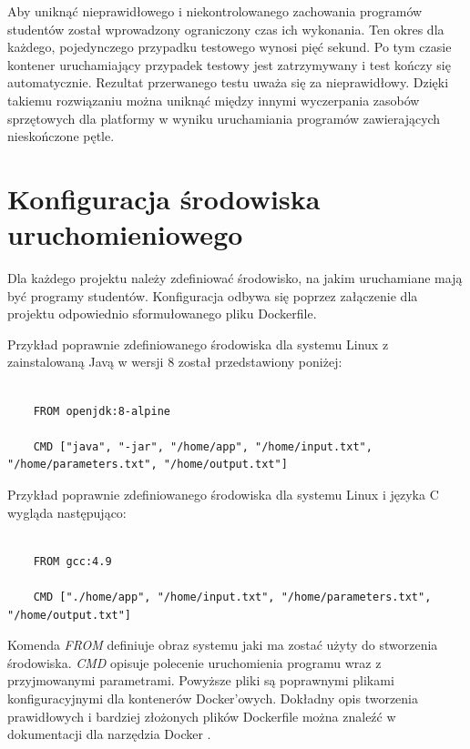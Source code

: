 Aby uniknąć nieprawidłowego i niekontrolowanego zachowania programów studentów został wprowadzony ograniczony czas ich wykonania.
Ten okres dla każdego, pojedynczego przypadku testowego wynosi pięć sekund.
Po tym czasie kontener uruchamiający przypadek testowy jest zatrzymywany i test kończy się automatycznie.
Rezultat przerwanego testu uważa się za nieprawidłowy.
Dzięki takiemu rozwiązaniu można uniknąć między innymi wyczerpania zasobów sprzętowych dla platformy w wyniku uruchamiania programów zawierających nieskończone pętle.


\section {Konfiguracja środowiska uruchomieniowego}
\label{environment_configuration}

Dla każdego projektu należy zdefiniować środowisko, na jakim uruchamiane mają być programy studentów.
Konfiguracja odbywa się poprzez załączenie dla projektu odpowiednio sformułowanego pliku Dockerfile.

Przykład poprawnie zdefiniowanego środowiska dla systemu Linux z zainstalowaną Javą w wersji 8 został przedstawiony poniżej:

{\selectfont
\tiny
\begin{lstlisting}

    FROM openjdk:8-alpine

    CMD ["java", "-jar", "/home/app", "/home/input.txt", "/home/parameters.txt", "/home/output.txt"]

\end{lstlisting}
}

Przykład poprawnie zdefiniowanego środowiska dla systemu Linux i języka C wygląda następująco:

{\selectfont
\tiny
\begin{lstlisting}

    FROM gcc:4.9

    CMD ["./home/app", "/home/input.txt", "/home/parameters.txt", "/home/output.txt"]

\end{lstlisting}
}

Komenda \textit{FROM} definiuje obraz systemu jaki ma zostać użyty do stworzenia środowiska.
\textit{CMD} opisuje polecenie uruchomienia programu wraz z przyjmowanymi parametrami.
Powyższe pliki są poprawnymi plikami konfiguracyjnymi dla kontenerów Docker'owych.
Dokładny opis tworzenia prawidłowych i bardziej złożonych plików Dockerfile można znaleźć w dokumentacji dla narzędzia Docker \cite{docker-config}.

